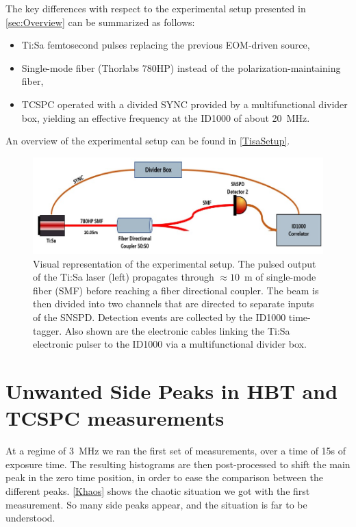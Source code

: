 The key differences with respect to the experimental setup presented in \autoref{sec:Overview} can be summarized as follows:
\begin{itemize}
    \item Ti:Sa femtosecond pulses replacing the previous EOM-driven source,
    \item Single-mode fiber (Thorlabs 780HP) instead of the polarization-maintaining fiber,
    \item TCSPC operated with a divided SYNC provided by a multifunctional divider box, yielding an effective frequency at the ID1000 of about 20~MHz.
\end{itemize}

An overview of the experimental setup can be found in \autoref{TisaSetup}.

\begin{figure}[hbtp]
\centering
\includegraphics[width=1\textwidth]{TiSa_Setup.jpg}
\caption{Visual representation of the experimental setup. The pulsed output of the Ti:Sa laser (left) propagates through $\approx 10$~m of single-mode fiber (SMF) before reaching a fiber directional coupler. The beam is then divided into two channels that are directed to separate inputs of the SNSPD. Detection events are collected by the ID1000 time-tagger. Also shown are the electronic cables linking the Ti:Sa electronic pulser to the ID1000 via a multifunctional divider box.}
\label{TisaSetup}
\end{figure}




\section{Unwanted Side Peaks in HBT and TCSPC measurements}
\label{cpp:Initial-khaos}
At a regime of 3~MHz we ran the first set of measurements, over a time of 15s of exposure time.
The resulting histograms are then post-processed to shift the main peak in the zero time position, in order to ease the comparison between the different peaks.
\autoref{Khaos} shows the chaotic situation we got with the first measurement. So many side peaks appear, and the situation is far to be understood.

